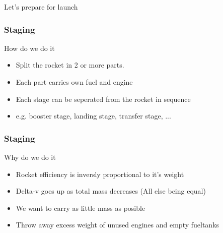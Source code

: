{
\begin{frame}
    \begin{block}{}
        \begin{center}
            Let's prepare for launch
        \end{center}
    \end{block}
\end{frame}
%
\begin{frame}
\end{frame}
\begin{frame}
    \frametitle{Staging}
    \begin{block}{How do we do it}
        \begin{itemize}
            \item Split the rocket in 2 or more parts.
            \item Each part carries own fuel and engine
            \item Each stage can be seperated from the rocket in sequence
            \item e.g. booster stage, landing stage, transfer stage, ...
        \end{itemize}
    \end{block}
\end{frame}
\begin{frame}
    \frametitle{Staging}
    \begin{block}{Why do we do it}
        \begin{itemize}
            \item Rocket efficiency is inversly proportional to it's weight
            \item Delta-v goes up as total mass decreases (All else being equal)
            \item We want to carry as little mass as posible
            \item Throw away excess weight of unused engines and empty fueltanks
        \end{itemize}
    \end{block}
\end{frame}
}
